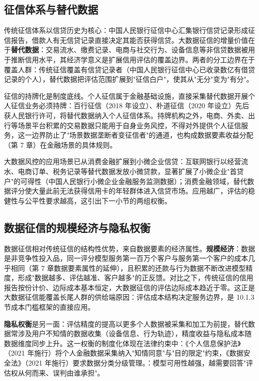 \subsection{征信体系与替代数据}

传统征信体系以信贷历史为核心：中国人民银行征信中心汇集银行信贷记录形成征信报告，借款人有无信贷记录直接决定其能否获得信贷。大数据征信的增量价值在于\textbf{替代数据}：交易流水、缴费记录、电商与社交行为、设备信息等非信贷数据被用于推断信用水平，其经济学意义是扩展信用评估的覆盖边界。两者的分工边界在于覆盖人群：传统征信覆盖有信贷记录者（中国人民银行征信中心已收录数亿有借贷记录的个人），替代数据把评估范围扩展到"征信白户"，使其从"无分"变为"有分"。

征信的持牌化是制度底线。个人征信属于金融基础设施，直接采集替代数据开展个人征信业务必须持牌：百行征信（2018 年设立）、朴道征信（2020 年设立）先后获人民银行许可，将替代数据纳入个人征信体系。持牌机构之外，电商、外卖、出行等场景平台积累的交易数据只能用于自身业务风控，不得对外提供个人征信服务，这一边界防止了"场景数据垄断者变征信者"的通道，也构成数据要素收益分配（第 7 章）在金融场景的具体规则。

大数据风控的应用场景已从消费金融扩展到小微企业信贷：互联网银行以经营流水、电商订单、税务记录等替代数据发放小微贷款，显著扩展了小微企业"首贷户"的可得性（中国人民银行小微企业金融服务监测数据）；消费金融领域，替代数据评分使大量此前无法获得信用卡的年轻群体进入信贷市场。应用越广，评估的稳健性与公平性要求越高，这引出下一小节的两组权衡。

\subsection{数据征信的规模经济与隐私权衡}

数据征信相对传统征信的结构性优势，来自数据要素的经济属性。\textbf{规模经济}：数据是非竞争性投入品，同一评分模型服务第一百万个客户与服务第一个客户的成本几乎相同（第 7 章数据要素属性的延伸），且积累的还款与行为数据不断改进模型精度，形成"数据越多、评估越准、客户越多"的正反馈。对比之下，传统征信的信用报告按份计价、边际成本基本恒定，大数据征信的评估边际成本趋近于零。这正是大数据征信能覆盖长尾人群的供给端原因：评估成本结构决定服务边界，是 10.1.3 节成本门槛框架的直接应用。

\textbf{隐私权衡}是另一面：评估精度的提高以更多个人数据被采集和加工为前提，替代数据常涉及用户不知情的数据收集（设备信息、行为轨迹），精度收益与隐私成本随数据维度同步上升。这一权衡的制度化体现在法律约束中：《个人信息保护法》（2021 年施行）将个人金融数据采集纳入"知情同意"与"目的限定"约束，《数据安全法》（2021 年施行）要求数据分类分级管理。：模型可用性越强，越需要回答"评估权从何而来、误判由谁承担"。

